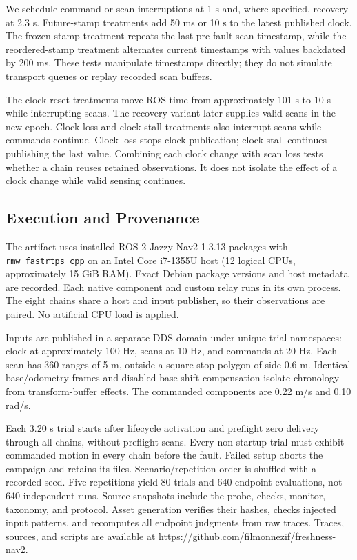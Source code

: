 \documentclass[conference]{IEEEtran}
\begin{document}
We schedule command or scan interruptions at 1 s and, where specified, recovery at 2.3 s. Future-stamp treatments add 50 ms or 10 s to the latest published clock. The frozen-stamp treatment repeats the last pre-fault scan timestamp, while the reordered-stamp treatment alternates current timestamps with values backdated by 200 ms. These tests manipulate timestamps directly; they do not simulate transport queues or replay recorded scan buffers.

The clock-reset treatments move ROS time from approximately 101 s to 10 s while interrupting scans. The recovery variant later supplies valid scans in the new epoch. Clock-loss and clock-stall treatments also interrupt scans while commands continue. Clock loss stops clock publication; clock stall continues publishing the last value. Combining each clock change with scan loss tests whether a chain reuses retained observations. It does not isolate the effect of a clock change while valid sensing continues.

\subsection{Execution and Provenance}
The artifact uses installed ROS 2 Jazzy Nav2 1.3.13 packages with \texttt{rmw\_fastrtps\_cpp} on an Intel Core i7-1355U host (12 logical CPUs, approximately 15 GiB RAM). Exact Debian package versions and host metadata are recorded. Each native component and custom relay runs in its own process. The eight chains share a host and input publisher, so their observations are paired. No artificial CPU load is applied.

Inputs are published in a separate DDS domain under unique trial namespaces: clock at approximately 100 Hz, scans at 10 Hz, and commands at 20 Hz. Each scan has 360 ranges of 5 m, outside a square stop polygon of side 0.6 m. Identical base/odometry frames and disabled base-shift compensation isolate chronology from transform-buffer effects. The commanded components are 0.22 m/s and 0.10 rad/s.

Each 3.20 s trial starts after lifecycle activation and preflight zero delivery through all chains, without preflight scans. Every non-startup trial must exhibit commanded motion in every chain before the fault. Failed setup aborts the campaign and retains its files. Scenario/repetition order is shuffled with a recorded seed. Five repetitions yield 80 trials and 640 endpoint evaluations, not 640 independent runs. Source snapshots include the probe, checks, monitor, taxonomy, and protocol. Asset generation verifies their hashes, checks injected input patterns, and recomputes all endpoint judgments from raw traces. Traces, sources, and scripts are available at \url{https://github.com/filmonnezif/freshness-nav2}.
\end{document}
